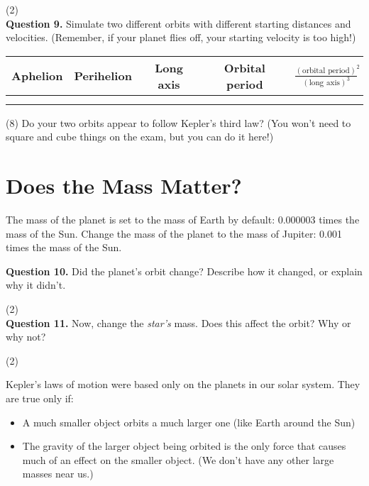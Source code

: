 \documentclass[11pt]{article}
\begin{document}
\vspace{1.5cm}
(2) \hrulefill\\

\textbf{Question 9.} Simulate two different orbits with different starting distances and velocities. (Remember, if your planet flies off, your starting velocity is too high!)

\begin{center}
\Large
\begin{tabular}{| c | c | c | c | c |}
	\hline
	Aphelion & Perihelion & Long axis & Orbital period & $\frac{(\mbox{orbital period})^2}{(\mbox{long axis})^3}$ \\
	\hline
	& & & & \\[1.2cm]
	\hline
	& & & & \\[1.2cm]
	\hline
	\end{tabular}
\end{center}

(8) Do your two orbits appear to follow Kepler's third law? (You won't need to square and cube things on the exam, but you can do it here!)

\newpage

\section{Does the Mass Matter?}

The mass of the planet is set to the mass of Earth by default: 0.000003 times the mass of the Sun. Change the mass of the planet to the mass of Jupiter: 0.001 times the mass of the Sun. 

\textbf{Question 10.} Did the planet's orbit change? Describe how it changed, or explain why it didn't.

\vspace{1.5cm}

(2) \hrulefill\\

\textbf{Question 11.} Now, change the {\it star's} mass. Does this affect the orbit? Why or why not?

\vspace{1.5cm}

(2) \hrulefill\\

\vspace{3em}

Kepler's laws of motion were based only on the planets in our solar system. They are true only if:

\begin{itemize}
	\item A much smaller object orbits a much larger one (like Earth around the Sun)
	\item The gravity of the larger object being orbited is the only force that causes much of an effect on the smaller object. (We don't have any other large masses near us.)
\end{itemize}
\end{document}
